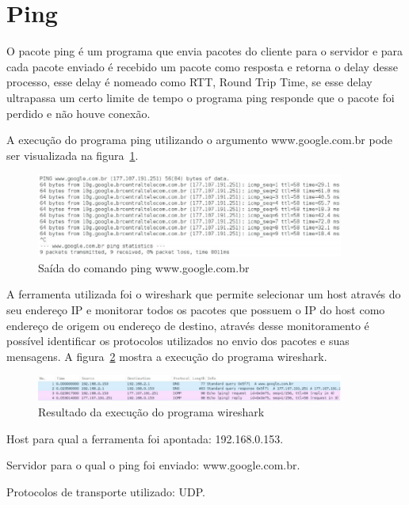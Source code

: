 \section{Ping}

O pacote ping é um programa que envia pacotes do cliente para o servidor e para
cada pacote enviado é recebido um pacote como resposta e retorna o delay desse
processo, esse delay é nomeado como RTT, Round Trip Time, se esse delay
ultrapassa um certo limite de tempo o programa ping responde que o pacote foi
perdido e não houve conexão.

A execução do programa ping utilizando o argumento www.google.com.br pode ser
visualizada na figura~\ref{fig:ping_result}.

\begin{figure}[h]
  \centering
  \includegraphics[width=0.9\textwidth]{figuras/ping_result.eps}
  \caption{Saída do comando ping www.google.com.br}
  \label{fig:ping_result}
\end{figure}

A ferramenta utilizada foi o wireshark que permite selecionar um host através
do seu endereço IP e monitorar todos os pacotes que possuem o IP do host como
endereço de origem ou endereço de destino, através desse monitoramento é
possível identificar os protocolos utilizados no envio dos pacotes e suas
mensagens. A figura~\ref{fig:wireshark_result} mostra a execução do programa
wireshark.

\begin{figure}[h]
  \centering
  \includegraphics[width=0.9\textwidth]{figuras/wireshark.eps}
  \caption{Resultado da execução do programa wireshark}
  \label{fig:wireshark_result}
\end{figure}

Host para qual a ferramenta foi apontada: 192.168.0.153.

Servidor para o qual o ping foi enviado: www.google.com.br.

Protocolos de transporte utilizado: UDP.

